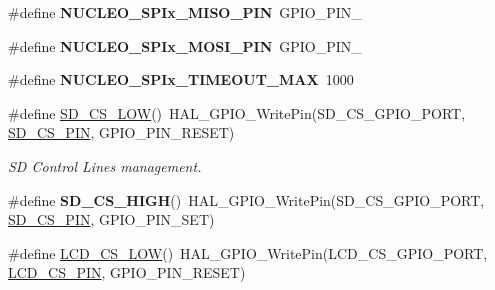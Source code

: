 \begin{DoxyCompactItemize}
\#define {\bfseries N\+U\+C\+L\+E\+O\+\_\+\+S\+P\+Ix\+\_\+\+M\+I\+S\+O\+\_\+\+P\+IN}~G\+P\+I\+O\+\_\+\+P\+I\+N\+\_
\item 
\mbox{\label{group___s_t_m32_f0_x_x___n_u_c_l_e_o___b_u_s_ga024f48b9b784067b2c575c38e3a0a782}} 
\#define {\bfseries N\+U\+C\+L\+E\+O\+\_\+\+S\+P\+Ix\+\_\+\+M\+O\+S\+I\+\_\+\+P\+IN}~G\+P\+I\+O\+\_\+\+P\+I\+N\+\_
\item 
\mbox{\label{group___s_t_m32_f0_x_x___n_u_c_l_e_o___b_u_s_ga6b47e2bf332a8ab7c25fb173d3701701}} 
\#define {\bfseries N\+U\+C\+L\+E\+O\+\_\+\+S\+P\+Ix\+\_\+\+T\+I\+M\+E\+O\+U\+T\+\_\+\+M\+AX}~1000
\item 
\mbox{\label{group___s_t_m32_f0_x_x___n_u_c_l_e_o___b_u_s_gaac4b728222e9597d36fcc079324da267}} 
\#define \hyperlink{group___s_t_m32_f0_x_x___n_u_c_l_e_o___b_u_s_gaac4b728222e9597d36fcc079324da267}{S\+D\+\_\+\+C\+S\+\_\+\+L\+OW}()~H\+A\+L\+\_\+\+G\+P\+I\+O\+\_\+\+Write\+Pin(S\+D\+\_\+\+C\+S\+\_\+\+G\+P\+I\+O\+\_\+\+P\+O\+RT, \hyperlink{group___s_t_m32_f0_x_x___n_u_c_l_e_o___b_u_s_ga04d57a6c18b2d5e81f31093e58ed0c62}{S\+D\+\_\+\+C\+S\+\_\+\+P\+IN}, G\+P\+I\+O\+\_\+\+P\+I\+N\+\_\+\+R\+E\+S\+ET)
\begin{DoxyCompactList}\small\item\em SD Control Lines management. \end{DoxyCompactList}\item 
\mbox{\label{group___s_t_m32_f0_x_x___n_u_c_l_e_o___b_u_s_ga8f468ae6303f1d92df76ce993661cb72}} 
\#define {\bfseries S\+D\+\_\+\+C\+S\+\_\+\+H\+I\+GH}()~H\+A\+L\+\_\+\+G\+P\+I\+O\+\_\+\+Write\+Pin(S\+D\+\_\+\+C\+S\+\_\+\+G\+P\+I\+O\+\_\+\+P\+O\+RT, \hyperlink{group___s_t_m32_f0_x_x___n_u_c_l_e_o___b_u_s_ga04d57a6c18b2d5e81f31093e58ed0c62}{S\+D\+\_\+\+C\+S\+\_\+\+P\+IN}, G\+P\+I\+O\+\_\+\+P\+I\+N\+\_\+\+S\+ET)
\item 
\mbox{\label{group___s_t_m32_f0_x_x___n_u_c_l_e_o___b_u_s_gad781fb7302672d9360ea7045ab45bb7d}} 
\#define \hyperlink{group___s_t_m32_f0_x_x___n_u_c_l_e_o___b_u_s_gad781fb7302672d9360ea7045ab45bb7d}{L\+C\+D\+\_\+\+C\+S\+\_\+\+L\+OW}()~H\+A\+L\+\_\+\+G\+P\+I\+O\+\_\+\+Write\+Pin(L\+C\+D\+\_\+\+C\+S\+\_\+\+G\+P\+I\+O\+\_\+\+P\+O\+RT, \hyperlink{group___s_t_m32_f0_x_x___n_u_c_l_e_o___b_u_s_ga50d72083b1ed4dd0bc2eaabb4a0332c8}{L\+C\+D\+\_\+\+C\+S\+\_\+\+P\+IN}, G\+P\+I\+O\+\_\+\+P\+I\+N\+\_\+\+R\+E\+S\+ET)

\end{DoxyCompactItemize}
